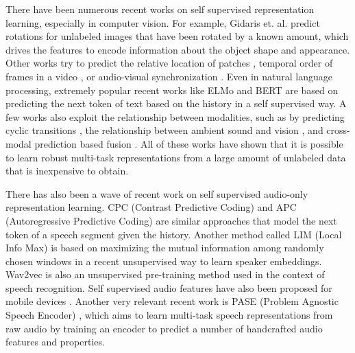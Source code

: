 \documentclass{article}
\begin{document}
There have been numerous recent works on self supervised representation learning, especially in computer vision. For example, Gidaris et. al. \cite{gidaris2018unsupervised} predict rotations for unlabeled images that have been rotated by a known amount, which drives the features to encode information about the object shape and appearance. Other works try to predict the relative location of patches \cite{doersch2015unsupervised}, temporal order of frames in a video \cite{fernando2017self}, or audio-visual synchronization \cite{korbar2018cooperative, multisensory2018}. Even in natural language processing, extremely popular recent works like ELMo \cite{peters2018deep} and BERT \cite{devlin2018bert} are based on predicting the next token of text based on the history in a self supervised way. A few works also exploit the relationship between modalities, such as by predicting cyclic transitions \cite{pham2019found}, the relationship between ambient sound and vision \cite{owens2018learning}, and cross-modal prediction based fusion \cite{petridis2015prediction}. All of these works have shown that it is possible to learn robust multi-task representations from a large amount of unlabeled data that is inexpensive to obtain.

There has also been a wave of recent work on self supervised audio-only representation learning.  CPC (Contrast Predictive Coding) \cite{oord2018representation} and APC (Autoregressive Predictive Coding) \cite{chung2019unsupervised} are similar approaches that model the next token of a speech segment given the history. Another method called LIM (Local Info Max) \cite{ravanelli2018learning} is based on maximizing the mutual information among randomly chosen windows in a recent unsupervised way to learn speaker embeddings. Wav2vec \cite{schneider2019wav2vec} is also an unsupervised pre-training method used in the context of speech recognition. Self supervised audio features have also been proposed for mobile devices \cite{tagliasacchi2019self}. Another very relevant recent work is PASE (Problem Agnostic Speech Encoder) \cite{pascual2019learning}, which aims to learn multi-task speech representations from raw audio by training an encoder to predict a number of handcrafted audio features and properties.
\end{document}

